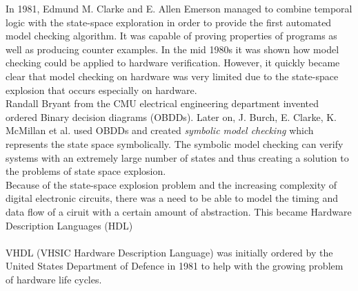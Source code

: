\documentclass[a4paper]{report}
\begin{document}
In 1981, Edmund M. Clarke and E. Allen Emerson managed to combine temporal logic with the state-space exploration in order to provide the first automated model checking algorithm\cite{Clarke1981}. It was capable of proving properties of programs as well as producing counter examples. 
In the mid 1980s it was shown how model checking could be applied to hardware verification. However, it quickly became clear that model checking on hardware was very limited due to the state-space explosion that occurs especially on hardware. \\ 
Randall Bryant from the CMU electrical engineering department invented ordered Binary decision diagrams (OBDDs). Later on, J. Burch, E. Clarke, K. McMillan et al.\cite{Burch1992} used OBDDs and created \textit{symbolic model checking} which represents the state space symbolically. The symbolic model checking can verify systems with an extremely large number of states and thus creating a solution to the problems of state space explosion.\\
Because of the state-space explosion problem and the increasing complexity of digital electronic circuits, there was a need to be able to model the timing and data flow of a ciruit with a certain amount of abstraction. This became Hardware Description Languages (HDL) \\\\
VHDL (VHSIC Hardware Description Language) was initially ordered by the United States Department of Defence in 1981 to help with the growing problem of hardware life cycles. 


%
%
\end{document}
